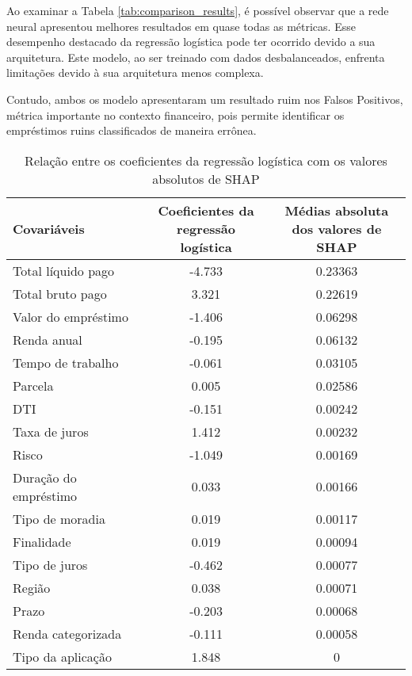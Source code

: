 Ao examinar a Tabela \ref{tab:comparison_results}, é possível observar que a rede neural apresentou melhores
resultados em quase todas as métricas. Esse desempenho destacado
da regressão logística pode ter ocorrido devido a sua arquitetura. Este modelo, ao ser treinado
com dados desbalanceados, enfrenta limitações devido à sua arquitetura menos complexa.

Contudo, ambos os modelo apresentaram um resultado ruim nos Falsos Positivos, métrica importante no contexto 
financeiro, pois permite identificar os empréstimos ruins classificados de maneira errônea.



\begin{table}[H]
\centering
\begin{tabular}{lcc}
  \hline
  \textbf{Covariáveis}               &   \parbox{4cm}{\centering\textbf{Coeficientes da \\ regressão logística}} &  
  \parbox{5cm}{ \centering\textbf{Médias absoluta \\ dos valores de SHAP}} \\
  \hline
   Total líquido pago    &         -4.733 & 0.23363 \\
   Total bruto pago      &          3.321 & 0.22619 \\
   Valor do empréstimo   &         -1.406 & 0.06298 \\
   Renda anual           &         -0.195 & 0.06132 \\
   Tempo de trabalho &         -0.061 & 0.03105 \\
   Parcela               &         0.005 & 0.02586 \\
   DTI                   &         -0.151 & 0.00242 \\
   Taxa de juros         &          1.412 & 0.00232 \\
   Risco                  &         -1.049 & 0.00169 \\
   Duração do empréstimo &          0.033 & 0.00166 \\
   Tipo de moradia       &         0.019 & 0.00117 \\
   Finalidade            &         0.019 & 0.00094 \\
   Tipo de juros        &         -0.462 & 0.00077 \\
   Região                &          0.038 & 0.00071 \\
   Prazo                 &         -0.203 & 0.00068 \\
   Renda categorizada    &         -0.111 & 0.00058 \\
   Tipo da aplicação     &         1.848 & 0       \\
  \hline
  \end{tabular}
  \caption{Relação entre os coeficientes da regressão logística com os valores absolutos de SHAP}
  \label{tab:coef_vs_shap}
\end{table}

